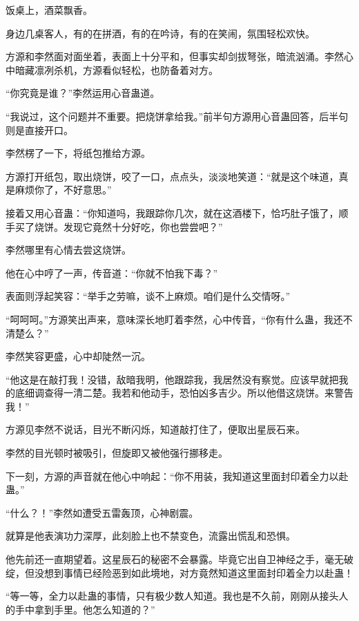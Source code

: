 
\begin{this_body}

饭桌上，酒菜飘香。

身边几桌客人，有的在拼酒，有的在吟诗，有的在笑闹，氛围轻松欢快。

方源和李然面对面坐着，表面上十分平和，但事实却剑拔弩张，暗流汹涌。李然心中暗藏凛冽杀机，方源看似轻松，也防备着对方。

“你究竟是谁？”李然运用心音蛊道。

“我说过，这个问题并不重要。把烧饼拿给我。”前半句方源用心音蛊回答，后半句则是直接开口。

李然楞了一下，将纸包推给方源。

方源打开纸包，取出烧饼，咬了一口，点点头，淡淡地笑道：“就是这个味道，真是麻烦你了，不好意思。”

接着又用心音蛊：“你知道吗，我跟踪你几次，就在这酒楼下，恰巧肚子饿了，顺手买了烧饼。发现它竟然十分好吃，你也尝尝吧？”

李然哪里有心情去尝这烧饼。

他在心中哼了一声，传音道：“你就不怕我下毒？”

表面则浮起笑容：“举手之劳嘛，谈不上麻烦。咱们是什么交情呀。”

“呵呵呵。”方源笑出声来，意味深长地盯着李然，心中传音，“你有什么蛊，我还不清楚么？”

李然笑容更盛，心中却陡然一沉。

“他这是在敲打我！没错，敌暗我明，他跟踪我，我居然没有察觉。应该早就把我的底细调查得一清二楚。我若和他动手，恐怕凶多吉少。所以他借这烧饼。来警告我！”

方源见李然不说话，目光不断闪烁，知道敲打住了，便取出星辰石来。

李然的目光顿时被吸引，但旋即又被他强行挪移走。

下一刻，方源的声音就在他心中响起：“你不用装，我知道这里面封印着全力以赴蛊。”

“什么？！”李然如遭受五雷轰顶，心神剧震。

就算是他表演功力深厚，此刻脸上也不禁变色，流露出慌乱和恐惧。

他先前还一直期望着。这星辰石的秘密不会暴露。毕竟它出自卫神经之手，毫无破绽，但没想到事情已经险恶到如此境地，对方竟然知道这里面封印着全力以赴蛊！

“等一等，全力以赴蛊的事情，只有极少数人知道。我也是不久前，刚刚从接头人的手中拿到手里。他怎么知道的？”


\end{this_body}
